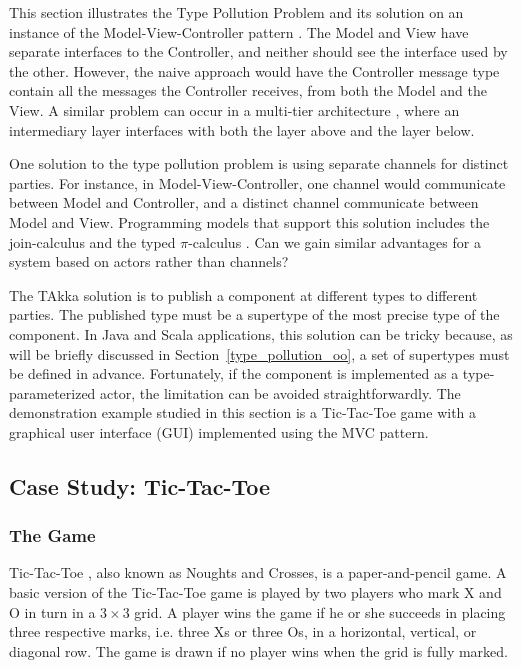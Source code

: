 This section illustrates the Type Pollution Problem and its solution on an
instance of the Model-View-Controller pattern \citep{reenskaug1979original, burbeck87}.  The Model
and View have separate interfaces to the Controller, and neither
should see the interface used by the other.  However, the naive
approach would have the Controller message type contain all the
messages the Controller receives, from both the Model and the View.
A similar problem can occur in a multi-tier architecture \citep{fowler2002patterns},
where an intermediary layer interfaces with both the layer above
and the layer below.

One solution to the type pollution problem is using separate channels
for distinct parties.  For instance, in Model-View-Controller, one
channel would communicate between Model and Controller, and a distinct
channel communicate between Model and View.  Programming models that
support this solution includes the join-calculus \citep{full_join} and
the typed $\pi$-calculus \citep{pi_book}.  Can we gain similar
advantages for a system based on actors rather than channels?

The TAkka solution is to publish a component at different types to different 
parties.  The published type must be a supertype of the most precise type of 
the component.  In Java and Scala applications, this solution can be tricky 
because, as will be briefly discussed in Section~\ref{type_pollution_oo}, a set 
of supertypes must be defined in advance.  
Fortunately, if the component is implemented as a type-parameterized actor, 
the limitation can be avoided straightforwardly.  The demonstration example 
studied in this section is a Tic-Tac-Toe game with a graphical user interface 
(GUI) implemented using the MVC pattern.


\subsection{Case Study: Tic-Tac-Toe}


\subsubsection{The Game}

Tic-Tac-Toe \citep{wiki:tictactoe}, also known as Noughts and Crosses, is a 
paper-and-pencil game.  A basic version of the Tic-Tac-Toe game is played by 
two players who mark X and O in turn in a $3\times3$ grid.  A player wins the 
game if he or she succeeds in placing three respective marks, i.e. three Xs or three Os, in a 
horizontal, vertical, or diagonal row.  The game is drawn if no player wins when 
the grid is fully marked.

